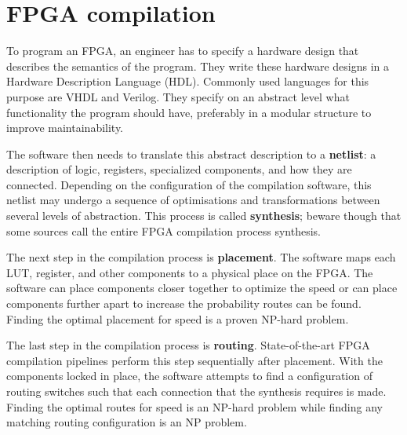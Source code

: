 \section{FPGA compilation}
\label{sec:compilation}
To program an FPGA, an engineer has to specify a hardware design that describes the semantics of the program. They write these hardware designs in a Hardware Description Language (HDL). Commonly used languages for this purpose are VHDL and Verilog. They specify on an abstract level what functionality the program should have, preferably in a modular structure to improve maintainability.

The software then needs to translate this abstract description to a \textbf{netlist}: a description of logic, registers, specialized components, and how they are connected. Depending on the configuration of the compilation software, this netlist may undergo a sequence of optimisations and transformations between several levels of abstraction. This process is called \textbf{synthesis}; beware though that some sources call the entire FPGA compilation process synthesis.

The next step in the compilation process is \textbf{placement}. The software maps each LUT, register, and other components to a physical place on the FPGA. The software can place components closer together to optimize the speed or can place components further apart to increase the probability routes can be found. Finding the optimal placement for speed is a proven NP-hard problem.

The last step in the compilation process is \textbf{routing}. State-of-the-art FPGA compilation pipelines perform this step sequentially after placement\cite{alhyari2019}. With the components locked in place, the software attempts to find a configuration of routing switches such that each connection that the synthesis requires is made. Finding the optimal routes for speed is an NP-hard problem while finding any matching routing configuration is an NP problem.

